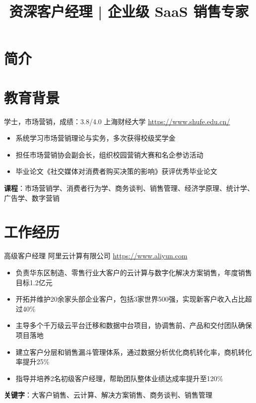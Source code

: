 \documentclass[a4paper, serif, 10pt]{moderncv}
\title{资深客户经理 | 企业级 SaaS 销售专家}
\begin{document}
\maketitle

\section{简介}

\section{教育背景}

        {学士，市场营销，成绩：3.8/4.0}
        {上海财经大学}
        {\url{https://www.shufe.edu.cn/}}
        {}
        {\begin{itemize}
\item 系统学习市场营销理论与实务，多次获得校级奖学金
\item 担任市场营销协会副会长，组织校园营销大赛和名企参访活动
\item 毕业论文《社交媒体对消费者购买决策的影响》获评优秀毕业论文
\end{itemize}
\textbf{课程}：市场营销学、消费者行为学、商务谈判、销售管理、经济学原理、统计学、广告学、数字营销}
\section{工作经历}

        {高级客户经理}
        {阿里云计算有限公司}
        {\url{https://www.aliyun.com}}
        {}
        {\begin{itemize}
\item 负责华东区制造、零售行业大客户的云计算与数字化解决方案销售，年度销售目标1.2亿元
\item 开拓并维护20余家头部企业客户，包括3家世界500强，实现新客户收入占比超过40\%
\item 主导多个千万级云平台迁移和数据中台项目，协调售前、产品和交付团队确保项目落地
\item 建立客户分层和销售漏斗管理体系，通过数据分析优化商机转化率，商机转化率提升25\%
\item 指导并培养2名初级客户经理，帮助团队整体业绩达成率提升至120\%
\end{itemize}
\textbf{关键字}：大客户销售、云计算、解决方案销售、商务谈判、销售管理}
\end{document}
